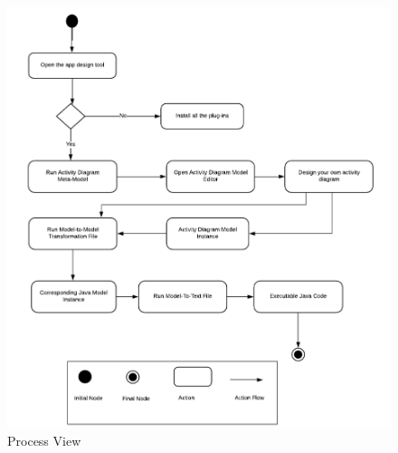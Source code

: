 \begin{figure}[!h]
	\includegraphics[width=\textwidth]{figs/ProcessView} 
	\caption{Process View}
	\label{figure:process}
\end{figure}



